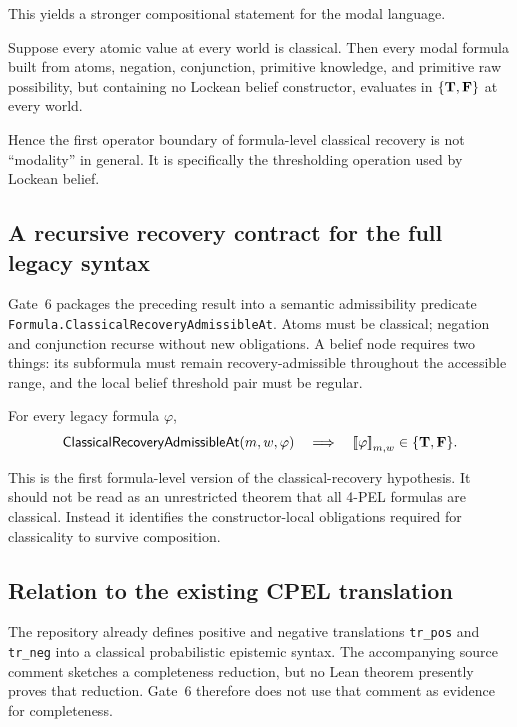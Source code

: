 This yields a stronger compositional statement for the modal language.

\begin{theorem}
\label{thm:belief-free-modal-recovery}
Suppose every atomic value at every world is classical.  Then every modal formula
built from atoms, negation, conjunction, primitive knowledge, and primitive raw
possibility, but containing no Lockean belief constructor, evaluates in
\(\{\mathbf{T},\mathbf{F}\}\) at every world.
\statusverified
\end{theorem}

Hence the first operator boundary of formula-level classical recovery is not
``modality'' in general.  It is specifically the thresholding operation used by
Lockean belief.

\subsection{A recursive recovery contract for the full legacy syntax}

Gate~6 packages the preceding result into a semantic admissibility predicate
\texttt{Formula.ClassicalRecoveryAdmissibleAt}.  Atoms must be classical; negation
and conjunction recurse without new obligations.  A belief node requires two things:
its subformula must remain recovery-admissible throughout the accessible range, and
the local belief threshold pair must be regular.

\begin{theorem}
\label{thm:full-formula-recovery}
For every legacy formula \(\varphi\),
\[
  \mathsf{ClassicalRecoveryAdmissibleAt}(m,w,\varphi)
  \quad\Longrightarrow\quad
  \mathopen{[\![}\varphi\mathclose{]\!]}_{m,w}\in\{\mathbf{T},\mathbf{F}\}.
\]
\statusverified
\end{theorem}

This is the first formula-level version of the classical-recovery hypothesis.  It
should not be read as an unrestricted theorem that all 4-PEL formulas are classical.
Instead it identifies the constructor-local obligations required for classicality to
survive composition.

\subsection{Relation to the existing CPEL translation}

The repository already defines positive and negative translations
\texttt{tr\_pos} and \texttt{tr\_neg} into a classical probabilistic epistemic
syntax.  The accompanying source comment sketches a completeness reduction, but no
Lean theorem presently proves that reduction.  Gate~6 therefore does not use that
comment as evidence for completeness.

